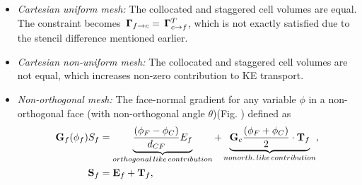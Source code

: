 \begin{itemize}

\item \textit{Cartesian uniform mesh:} The collocated and staggered cell volumes are equal. The constraint becomes $ \, \mathbf{\Gamma}_{f \rightarrow c} = \, \mathbf{\Gamma}_{c \rightarrow f}^T $, which is not exactly satisfied due to the stencil difference mentioned earlier.

\item \textit{Cartesian non-uniform mesh:} The collocated and staggered cell volumes are not equal, which increases non-zero contribution to KE transport.

\item \textit{Non-orthogonal mesh:} The face-normal gradient for any variable $\phi$ in a non-orthogonal face (with non-orthogonal angle $ \theta$)(Fig. ) defined as 
\begin{align}
\begin{split}
{\mathbf{G}_f}(\phi_f) {S}_f &= 
\underbrace{ 
 \frac{(\phi_F -\phi_C)}{d_{CF}} {E}_f
}_{orthogonal \, like \, contribution}
+ \underbrace{ 
 {\mathbf{G}_c}\frac{(\phi_F +\phi_C)}{2} \cdot \mathbf{T}_f
}_{non\-orth. \, like \, contribution},
\\
\mathbf{S}_f &= \mathbf{E}_f + \mathbf{T}_f,
\end{split}
\label{eqn:nonOrthCorr}
\end{align}


\end{itemize}
